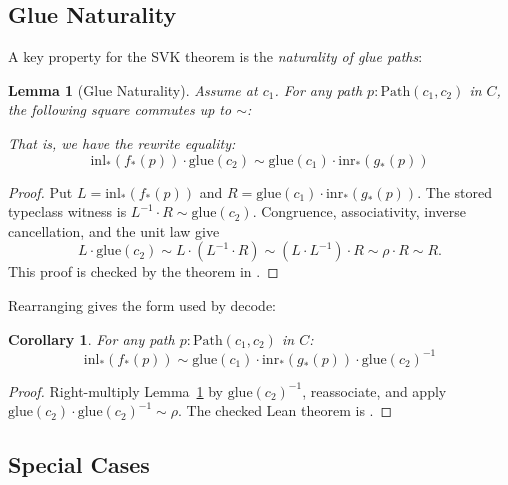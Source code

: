 \documentclass{lmcs}
\theoremstyle{definition}
\theoremstyle{plain}
\newtheorem{lemma}[definition]{Lemma}
\newtheorem{corollary}[definition]{Corollary}
\theoremstyle{remark}
\newcommand{\refl}{\rho}
\newcommand{\RwEq}{\sim}
\newcommand{\Path}{\mathrm{Path}}
\newcommand{\inl}{\mathrm{inl}}
\newcommand{\inr}{\mathrm{inr}}
\newcommand{\glmark}{\mathrm{glue}}
\begin{document}
\subsection{Glue Naturality}

A key property for the SVK theorem is the \emph{naturality of glue paths}:

\begin{lemma}[Glue Naturality]
\label{lem:glue-natural}
Assume  at \(c_1\).  For any path
$p : \Path(c_1, c_2)$ in $C$, the following square commutes up to $\RwEq$:
\begin{center}
\end{center}
That is, we have the rewrite equality:
\[
\inl_*(f_*(p)) \cdot \glmark(c_2) \RwEq \glmark(c_1) \cdot \inr_*(g_*(p))
\]
\end{lemma}

\begin{proof}
Put \(L=\inl_*(f_*(p))\) and
\(R=\glmark(c_1)\cdot\inr_*(g_*(p))\).  The stored typeclass witness is
\(L^{-1}\cdot R\RwEq\glmark(c_2)\).  Congruence, associativity, inverse
cancellation, and the unit law give
\[
L\cdot\glmark(c_2)
\RwEq L\cdot(L^{-1}\cdot R)
\RwEq (L\cdot L^{-1})\cdot R
\RwEq \refl\cdot R
\RwEq R.
\]
This proof is checked by the theorem
 in
.
\end{proof}

Rearranging gives the form used by decode:

\begin{corollary}
\label{cor:glue-natural-rearranged}
For any path $p : \Path(c_1, c_2)$ in $C$:
\[
\inl_*(f_*(p)) \RwEq \glmark(c_1) \cdot \inr_*(g_*(p)) \cdot \glmark(c_2)^{-1}
\]
\end{corollary}

\begin{proof}
Right-multiply Lemma~\ref{lem:glue-natural} by
\(\glmark(c_2)^{-1}\), reassociate, and apply
\(\glmark(c_2)\cdot\glmark(c_2)^{-1}\RwEq\refl\).  The checked Lean theorem is
.
\end{proof}

\subsection{Special Cases}
\end{document}
